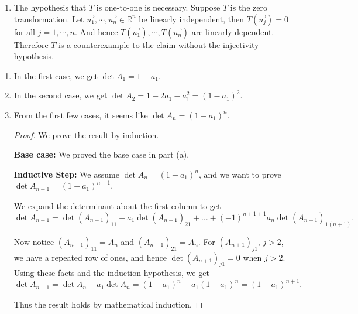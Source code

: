 \documentclass[12pt,letterpaper]{article}
\begin{document}
\begin{enumerate}
\begin{enumerate}
Therefore $T(\vec{u_1}), \cdots, T(\vec{u_n})$ are linearly independent.
  
  \item The hypothesis that $T$ is one-to-one is necessary.  Suppose $T$ is the zero transformation.  Let $\vec{u_1}, \cdots, \vec{u_n}\in \mathbb{R}^n$ be linearly independent, then $T(\vec{u_j})=0$ for all $j=1,\cdots, n$.  And hence $T(\vec{u_1}), \cdots, T(\vec{u_n})$ are linearly dependent.  Therefore $T$ is a counterexample to the claim without the injectivity hypothesis.
  
  \end{enumerate}
  
  \Answer 
  
    \begin{enumerate}
  
  \item In the first case, we get $\det{A_1}=1-a_1$.
  
  \item In the second case, we get $\det{A_2}=1-2a_1-a_1^2=(1-a_1)^2$.
  
  \item From the first few cases, it seems like $\det{A_n}=(1-a_1)^n$.
  
  \begin{proof}
  We prove the result by induction.
  
  {\bf Base case:} We proved the base case in part (a).
  
  {\bf Inductive Step:} We assume $\det{A_n} = (1-a_1)^n$, and we want to prove $\det{A_{n+1}}=(1-a_1)^{n+1}$.
  
  We expand the determinant about the first column to get
  $$\det{A_{n+1}}= \det (A_{n+1})_{11} - a_1 \det (A_{n+1})_{21}+\dots+(-1)^{n+1+1}a_n \det (A_{n+1})_{1(n+1)}.$$
  
  Now notice $(A_{n+1})_{11}=A_n$ and $(A_{n+1})_{21}=A_n$. For $(A_{n+1})_{j1}$, $j>2$, we have a repeated row of ones, and hence $\det{(A_{n+1})_{j1}}=0$ when $j>2$. Using these facts and the induction hypothesis, we get 
    $$\det{A_{n+1}}=\det A_n -a_1 \det  A_n= (1-a_1)^n-a_1(1-a_1)^n=(1-a_1)^{n+1}.$$
    
    Thus the result holds by mathematical induction.
  \end{proof}
  
  \end{enumerate}
  
  \Answer
  
    \begin{enumerate}
  

\end{enumerate}
\end{enumerate}
\end{document}
